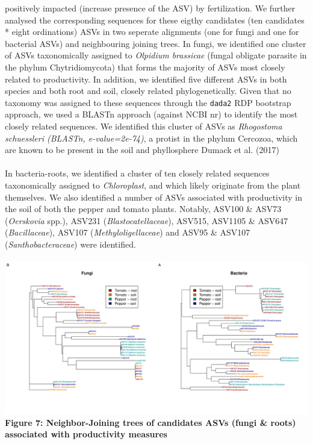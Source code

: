 \documentclass[11pt,]{article}
\begin{document}
positively impacted (increase presence of the ASV) by fertilization. We
further analysed the corresponding sequences for these eigthy candidates
(ten candidates * eight ordinations) ASVs in two seperate alignments
(one for fungi and one for bacterial ASVs) and neighbouring joining
trees. In fungi, we identified one cluster of ASVs taxonomically
assigned to \emph{Olpidium brassicae} (fungal obligate parasite in the
phylum Chytridiomycota) that forms the majority of ASVs most closely
related to productivity. In addition, we identified five different ASVs
in both species and both root and soil, closely related
phylogenetically. Given that no taxonomy was assigned to these sequences
through the \texttt{dada2} RDP bootstrap approach, we used a BLASTn
approach (against NCBI nr) to identify the most closely related
sequences. We identified this cluster of ASVs as \emph{Rhogostoma
schuessleri (BLASTn, e-value=2e-74)}, a protist in the phylum Cercozoa,
which are known to be present in the soil and phyllosphere Dumack et al.
(2017)\\
\hspace*{0.333em}\\
In bacteria-roots, we identified a cluster of ten closely related
sequences taxonomically assigned to \emph{Chloroplast}, and which likely
originate from the plant themselves. We also identified a number of ASVs
associated with productivity in the soil of both the pepper and tomato
plants. Notably, ASV100 \& ASV73 (\emph{Oerskovia} spp.), ASV231
(\emph{Blastocatellaceae}), ASV515, ASV1105 \& ASV647
(\emph{Bacillaceae}), ASV107 (\emph{Methyloligellaceae}) and ASV95 \&
ASV107 (\emph{Santhobacteraceae}) were identified. ~\\
\hspace*{0.333em}\\
\includegraphics{../figures/Figure7_candidateASVs.pdf}\\
\textbf{Figure 7: Neighbor-Joining trees of candidates ASVs (fungi \&
roots) associated with productivity measures} ~\\
\hspace*{0.333em}
\end{document}
